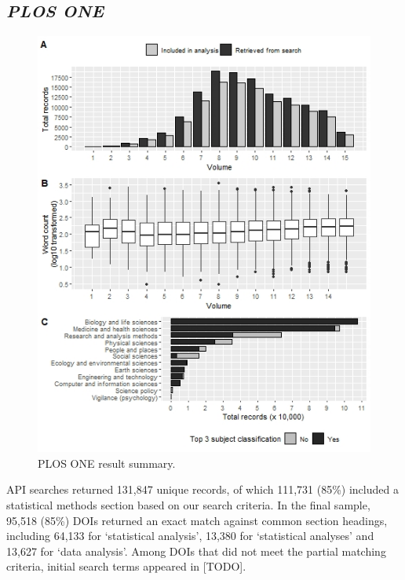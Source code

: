 \documentclass[12pt]{article}
\begin{document}
\hypertarget{plos-one}{%
\subsection{\texorpdfstring{\emph{PLOS ONE}}{PLOS ONE}}\label{plos-one}}

\begin{figure}

{\centering \includegraphics[width=0.95\linewidth]{figures/plos.summary} 

}

\caption{PLOS ONE result summary.}\label{fig:unnamed-chunk-3}
\end{figure}

API searches returned 131,847 unique records, of which 111,731 (85\%)
included a statistical methods section based on our search criteria. In
the final sample, 95,518 (85\%) DOIs returned an exact match against
common section headings, including 64,133 for `statistical analysis',
13,380 for `statistical analyses' and 13,627 for `data analysis'. Among
DOIs that did not meet the partial matching criteria, initial search
terms appeared in {[}TODO{]}.
\end{document}
